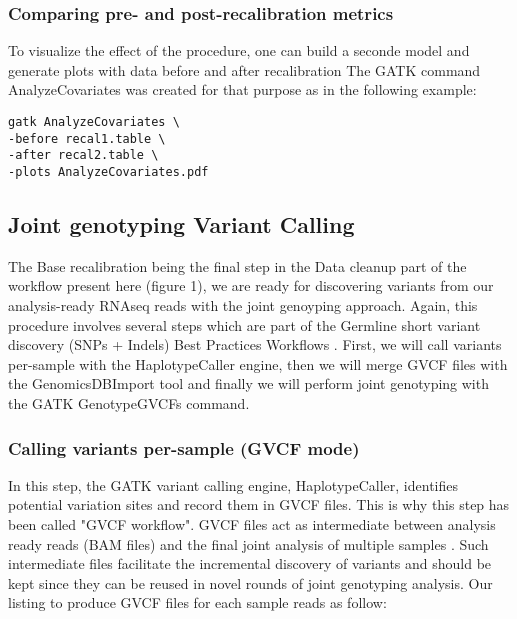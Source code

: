 \subsubsection{Comparing pre- and post-recalibration metrics}

To visualize the effect of the procedure, one can build a seconde model and generate plots with data before and after recalibration \cite{GATK_BaseQuality} The GATK command AnalyzeCovariates was created for that purpose as in the following example:

\begin{verbatim}
gatk AnalyzeCovariates \
-before recal1.table \
-after recal2.table \
-plots AnalyzeCovariates.pdf
\end{verbatim}



\subsection{Joint genotyping Variant Calling}


The Base recalibration being the final step in the Data cleanup part of the workflow present here (figure 1), we are ready for discovering variants from our analysis-ready RNAseq reads with the joint genoyping approach. Again, this procedure involves several steps which are part of the Germline short variant discovery (SNPs + Indels) Best Practices Workflows \cite{GATK_BP_Germline}. First, we will call variants per-sample with the HaplotypeCaller engine, then we will merge GVCF files with the GenomicsDBImport tool and finally we will perform joint genotyping with the GATK GenotypeGVCFs command.




\subsubsection{Calling variants per-sample (GVCF mode)}


In this step, the GATK variant calling engine, HaplotypeCaller, identifies potential variation sites and record them in GVCF files. This is why this step has been called "GVCF workflow". GVCF files act as intermediate between analysis ready reads (BAM files) and the final joint analysis of multiple samples \cite{GATK_jointCalling_1}. Such intermediate files facilitate the incremental discovery of variants and should be kept since they can be reused in novel rounds of joint genotyping analysis. Our listing to produce GVCF files for each sample reads as follow:


